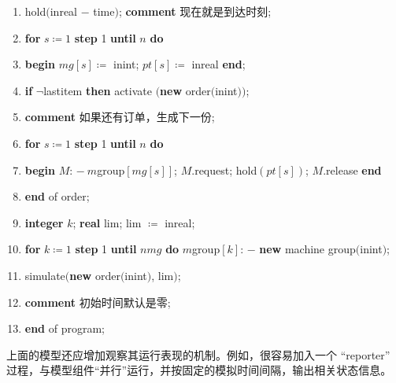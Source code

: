 \begin{enumerate}[nosep, label=\arabic*.]
	\item \label{pg:program-job-shop-15}
	\quad hold$($inreal $-$ time$)$; \textbf{comment} 现在就是到达时刻;
	
	\item \label{pg:program-job-shop-16}
	\quad \textbf{for} $s\coloneq 1$ \textbf{step} 1 \textbf{until} $n$ \textbf{do}
	
	\item \label{pg:program-job-shop-17}
	\quad \textbf{begin} $mg[s]\coloneq$ inint; $pt[s]\coloneq$ inreal \textbf{end};
	
	\item \label{pg:program-job-shop-18}
	\quad \textbf{if} $\neg$lastitem \textbf{then} activate $($\textbf{new} order$($inint$))$;
	
	\item \label{pg:program-job-shop-19}
	\quad \textbf{comment} 如果还有订单，生成下一份;
	
	\item \label{pg:program-job-shop-20}
	\quad \textbf{for} $s\coloneq 1$ \textbf{step} 1 \textbf{until} $n$ \textbf{do}
	
	\item \label{pg:program-job-shop-21}
	\quad \textbf{begin} $M$: $-\ m$group$[mg[s]]$; $M$.request; hold$(pt[s])$; $M$.release \textbf{end}
	
	\item \label{pg:program-job-shop-22}
	\textbf{end} of order;
	
	\item \label{pg:program-job-shop-23}
	\textbf{integer} $k$; \textbf{real} lim; lim $\coloneq$ inreal;
	
	\item \label{pg:program-job-shop-24}
	\textbf{for} $k\coloneq 1$ \textbf{step} 1 \textbf{until} $nmg$ \textbf{do} $m$group$[k]$: $-$ \textbf{new} machine group$($inint$)$;
	
	\item \label{pg:program-job-shop-25}
	simulate$($\textbf{new} order$($inint$)$, lim$)$;
	
	\item \label{pg:program-job-shop-26}
	\textbf{comment} 初始时间默认是零;
	
	\item \label{pg:program-job-shop-27}
	\textbf{end} of program;
\end{enumerate}

上面的模型还应增加观察其运行表现的机制。例如，很容易加入一个 ``reporter'' 过程，与模型组件“并行”运行，并按固定的模拟时间间隔，输出相关状态信息。

